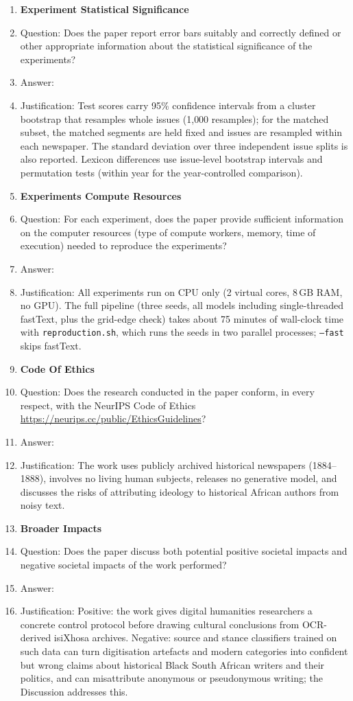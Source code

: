 \begin{enumerate}
\item {\bf Experiment Statistical Significance}
    \item[] Question: Does the paper report error bars suitably and correctly defined or other appropriate information about the statistical significance of the experiments?
    \item[] Answer: \answerYes{}
    \item[] Justification: Test scores carry 95\% confidence intervals from a cluster bootstrap that resamples whole issues (1{,}000 resamples); for the matched subset, the matched segments are held fixed and issues are resampled within each newspaper. The standard deviation over three independent issue splits is also reported. Lexicon differences use issue-level bootstrap intervals and permutation tests (within year for the year-controlled comparison).

\item {\bf Experiments Compute Resources}
    \item[] Question: For each experiment, does the paper provide sufficient information on the computer resources (type of compute workers, memory, time of execution) needed to reproduce the experiments?
    \item[] Answer: \answerYes{}
    \item[] Justification: All experiments run on CPU only (2 virtual cores, 8\,GB RAM, no GPU). The full pipeline (three seeds, all models including single-threaded fastText, plus the grid-edge check) takes about 75 minutes of wall-clock time with \texttt{reproduction.sh}, which runs the seeds in two parallel processes; \texttt{--fast} skips fastText.

\item {\bf Code Of Ethics}
    \item[] Question: Does the research conducted in the paper conform, in every respect, with the NeurIPS Code of Ethics \url{https://neurips.cc/public/EthicsGuidelines}?
    \item[] Answer: \answerYes{}
    \item[] Justification: The work uses publicly archived historical newspapers (1884--1888), involves no living human subjects, releases no generative model, and discusses the risks of attributing ideology to historical African authors from noisy text.

\item {\bf Broader Impacts}
    \item[] Question: Does the paper discuss both potential positive societal impacts and negative societal impacts of the work performed?
    \item[] Answer: \answerYes{}
    \item[] Justification: Positive: the work gives digital humanities researchers a concrete control protocol before drawing cultural conclusions from OCR-derived isiXhosa archives. Negative: source and stance classifiers trained on such data can turn digitisation artefacts and modern categories into confident but wrong claims about historical Black South African writers and their politics, and can misattribute anonymous or pseudonymous writing; the Discussion addresses this.


\end{enumerate}
